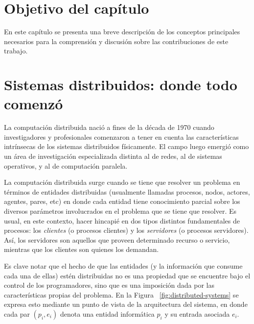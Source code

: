 \section{Objetivo del capítulo}\label{sec:prelim}


En este capítulo se presenta una breve descripción de los conceptos principales
necesarios para la comprensión y discusión sobre las
contribuciones de este trabajo.

\section{Sistemas distribuidos: donde todo comenzó}

La computación distribuida nació a fines de la década de 1970 cuando investigadores y profesionales
comenzaron a tener en cuenta las características intrínsecas de los sistemas distribuidos físicamente.
El campo luego emergió como un área de investigación especializada distinta al de redes, al de sistemas
operativos, y al de computación paralela.~\cite{raynal.dist.systems}

La computación distribuida surge cuando se tiene que resolver un problema en términos de entidades
distribuidas (usualmente llamadas procesos, nodos, actores, agentes, pares, etc) en donde cada
entidad tiene conocimiento parcial sobre los diversos parámetros involucrados en el problema que
se tiene que resolver.
Es usual, en este contexto, hacer hincapié en dos tipos distintos fundamentales de procesos:
los \textit{clientes} (o procesos clientes) y los \textit{servidores} (o procesos servidores).
Así, los servidores son aquellos que proveen determinado recurso o servicio, mientras que los
clientes son quienes los demandan.

Es clave notar que el hecho de que las entidades (y la información que consume cada una de ellas)
estén distribuidas no es una propiedad que se encuentre bajo el control de los programadores, sino 
que es una imposición dada por las características propias del problema. En la 
Figura ~\ref{fig:distributed-systems} se expresa esto mediante un punto de vista
de la arquitectura del sistema, en donde cada par $(p_i, e_i)$ denota una entidad informática $p_i$ y su
entrada asociada $e_i$.

